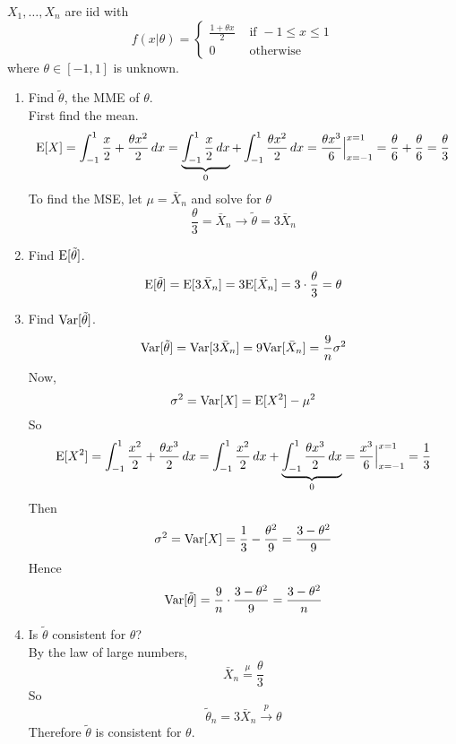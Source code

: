 \documentclass[12pt]{article}
\begin{document}
\begin{question} $X_1,\dots,X_n$ are iid with $$f(x|\theta) = \begin{cases} \frac{1+ \theta x}{2} &\text{ if } -1 \leq x \leq 1 \\ 0 &\text{ otherwise} \end{cases} $$ where $\theta \in [-1,1]$ is unknown. 
\begin{enumerate} 
\item Find $\tilde{\theta}$, the MME of $\theta$. \\
First find the mean. $$ \mathrm{E}[ X ] = \int_{-1}^1 \frac{x}{2} + \frac{\theta x^2}{2} \, dx = \underbrace{ \int_{-1}^1 \frac{x}{2} \, dx }_0 + \int_{-1}^1 \frac{\theta x^2}{2} \, dx = \frac{\theta x^3}{6}\Big|_{x=-1}^{x=1} = \frac{\theta}{6} + \frac{\theta}{6} = \frac{\theta}{3} $$ 
To find the MSE, let $\mu = \bar{X}_n$ and solve for $\theta$
$$ \frac{\theta}{3} = \bar{X}_n \to \tilde{\theta} = 3\bar{X}_n $$ 
\item Find $\mathrm{E}[ \tilde{\theta} ]$. 
$$ \mathrm{E}[ \tilde{\theta} ] = \mathrm{E}[ 3\bar{X}_n ] = 3\mathrm{E}[ \bar{X}_n ] = 3 \cdot \frac{\theta}{3} = \theta $$ 
\item Find $\mathrm{Var}[ \tilde{\theta} ]$. 
$$ \mathrm{Var}[ \tilde{\theta} ] = \mathrm{Var}[ 3\bar{X}_n ] = 9\mathrm{Var}[ \bar{X}_n ] = \frac{9}{n}\sigma^2 $$ 
Now, $$ \sigma^2 = \mathrm{Var}[ X ] = \mathrm{E}[ X^2 ] - \mu^2 $$ 
So $$ \mathrm{E}[ X^2 ] = \int_{-1}^1 \frac{x^2}{2} + \frac{\theta x^3}{2} \, dx = \int_{-1}^1 \frac{x^2}{2} \, dx + \underbrace{ \int_{-1}^1 \frac{\theta x^3}{2} \, dx}_0 = \frac{x^3}{6}\Big|_{x=-1}^{x=1} = \frac{1}{3} $$ 
Then $$ \sigma^2=\mathrm{Var}[ X ] = \frac{1}{3} - \frac{\theta^2}{9} = \frac{3-\theta^2}{9} $$ Hence $$ \mathrm{Var}[ \tilde{\theta} ] = \frac{9}{n} \cdot \frac{3-\theta^2}{9} = \frac{3-\theta^2}{n} $$ 
\item Is $\tilde{\theta}$ consistent for $\theta$? \\
By the law of large numbers, 
$$ \bar{X}_n \stackrel{\mu} = \frac{\theta}{3}$$
So $$ \tilde{\theta}_n = 3\bar{X}_n \stackrel{p}{\to} \theta $$ Therefore $\tilde{\theta}$ is consistent for $\theta$. 
\end{enumerate} 
\end{question} 
\end{document}
